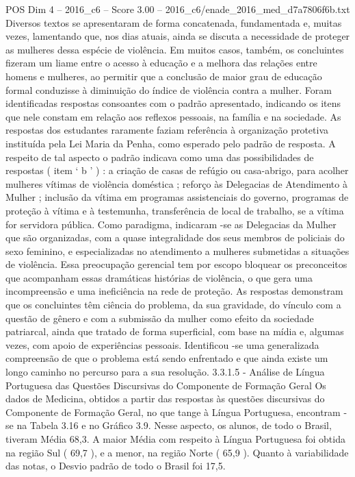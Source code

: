 \begin{textsample}{POS Dim 4 – 2016\_c6 – Score 3.00 – 2016\_c6/enade\_2016\_med\_d7a7806f6b.txt}
Diversos textos se apresentaram de forma concatenada, fundamentada e, muitas vezes, lamentando que, nos dias atuais, ainda se discuta a necessidade de proteger as mulheres dessa espécie de violência.
Em muitos casos, também, os concluintes fizeram um liame entre o acesso à educação e a melhora das relações entre homens e mulheres, ao permitir que a conclusão de maior grau de educação formal conduzisse à diminuição do índice de violência contra a mulher.
Foram identificadas respostas consoantes com o padrão apresentado, indicando os itens que nele constam em relação aos reflexos pessoais, na família e na sociedade.
As respostas dos estudantes raramente faziam referência à organização protetiva instituída pela Lei Maria da Penha, como esperado pelo padrão de resposta.
A respeito de tal aspecto o padrão indicava como uma das possibilidades de respostas ( item ‘ b ’ ) : a criação de casas de refúgio ou casa-abrigo, para acolher mulheres vítimas de violência doméstica ; reforço às Delegacias de Atendimento à Mulher ; inclusão da vítima em programas assistenciais do governo, programas de proteção à vítima e à testemunha, transferência de local de trabalho, se a vítima for servidora pública.
Como paradigma, indicaram -se as Delegacias da Mulher que são organizadas, com a quase integralidade dos seus membros de policiais do sexo feminino, e especializadas no atendimento a mulheres submetidas a situações de violência.
Essa preocupação gerencial tem por escopo bloquear os preconceitos que acompanham essas dramáticas histórias de violência, o que gera uma incompreensão e uma ineficiência na rede de proteção.
As respostas demonstram que os concluintes têm ciência do problema, da sua gravidade, do vínculo com a questão de gênero e com a submissão da mulher como efeito da sociedade patriarcal, ainda que tratado de forma superficial, com base na mídia e, algumas vezes, com apoio de experiências pessoais.
Identificou -se uma generalizada compreensão de que o problema está sendo enfrentado e que ainda existe um longo caminho no percurso para a sua resolução. 3.3.1.5 - Análise de Língua Portuguesa das Questões Discursivas do Componente de Formação Geral Os dados de Medicina, obtidos a partir das respostas às questões discursivas do Componente de Formação Geral, no que tange à Língua Portuguesa, encontram -se na Tabela 3.16 e no Gráfico 3.9.
Nesse aspecto, os alunos, de todo o Brasil, tiveram Média 68,3.
A maior Média com respeito à Língua Portuguesa foi obtida na região Sul ( 69,7 ), e a menor, na região Norte ( 65,9 ).
Quanto à variabilidade das notas, o Desvio padrão de todo o Brasil foi 17,5.

\end{textsample}
